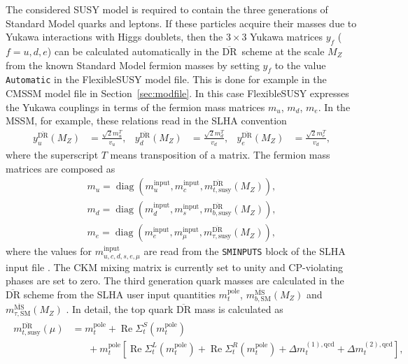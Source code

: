 \documentclass[final,3p,11pt,pdflatex]{elsarticle}
\makeatletter
\newcommand{\fs}{FlexibleSUSY\@\xspace}
\newcommand{\code}[1]{\lstinline|#1|}  %
\newcommand{\textoverline}[1]{$\overline{\mbox{#1}}$}
\newcommand{\DRbar}{\textoverline{DR}\xspace}
\newcommand{\MSbar}{\textoverline{MS}\xspace}
\newcommand{\userinput}{\text{input}}
\newcommand{\secref}[1]{Section~\ref{#1}}
\DeclareMathOperator{\diag}{diag}
\DeclareMathOperator{\re}{Re}
\makeatother
\begin{document}
The considered SUSY model is required to contain the three generations
of Standard Model quarks and leptons.  If these particles acquire
their masses due to Yukawa interactions with Higgs doublets, then the
$3\times 3$ Yukawa matrices $y_f$ ($f=u,d,e$) can be calculated
automatically in the \DRbar\ scheme at the scale $M_Z$ from the known
Standard Model fermion masses by setting $y_f$ to the value
\code{Automatic} in the \fs model file.
%
This is done for example in
the CMSSM model file in \secref{sec:modfile}.  In this case \fs
expresses the Yukawa couplings in terms of the fermion mass matrices
$m_u$, $m_d$, $m_e$.  In the MSSM, for example, these relations read
in the SLHA convention \cite{Allanach:2008qq}
%
\begin{align}
  y_u^{\text{\DRbar}}(M_Z) &= \frac{\sqrt{2} m_{u}^T}{v_u} , &
  y_d^{\text{\DRbar}}(M_Z) &= \frac{\sqrt{2} m_{d}^T}{v_d} , &
  y_e^{\text{\DRbar}}(M_Z) &= \frac{\sqrt{2} m_{e}^T}{v_d} ,
\end{align}
%
where the superscript $T$ means transposition of a matrix.  The
fermion mass matrices are composed as
%
\begin{align}
  m_u = \diag(m_{u}^{\userinput}, m_{c}^{\userinput}, m_{t,\text{susy}}^{\text{\DRbar}}(M_Z)) ,\\
  m_d = \diag(m_{d}^{\userinput}, m_{s}^{\userinput}, m_{b,\text{susy}}^{\text{\DRbar}}(M_Z)) ,\\
  m_e = \diag(m_{e}^{\userinput}, m_{\mu}^{\userinput}, m_{\tau,\text{susy}}^{\text{\DRbar}}(M_Z)),
\end{align}
%
where the values for $m_{u,c,d,s,e,\mu}^{\userinput}$ are read from
the \code{SMINPUTS} block of the SLHA input file \cite{Skands:2003cj}.
The CKM mixing matrix is currently set to unity and CP-violating
phases are set to zero.  The third generation quark masses are
calculated in the \DRbar scheme from the SLHA user input quantities
$m_t^\text{pole}$, $m_{b,\text{SM}}^{\text{\MSbar}}(M_Z)$ and
$m_{\tau,\text{SM}}^{\text{\MSbar}}(M_Z)$ \cite{Skands:2003cj}.  In
detail, the top quark \DRbar mass is calculated as
%
\begin{align}
  \begin{split}
    m_{t,\text{susy}}^{\text{\DRbar}}(\mu) &= m_t^\text{pole} +
    \re\Sigma_{t}^{S}(m_t^\text{pole}) \\
    &\phantom{=\;} + m_t^\text{pole}
    \left[ \re\Sigma_{t}^{L}(m_t^\text{pole}) +
      \re\Sigma_{t}^{R}(m_t^\text{pole}) + \Delta
      m_t^{(1),\text{qcd}} + \Delta m_t^{(2),\text{qcd}} \right] ,
  \end{split}
\end{align}
\end{document}
